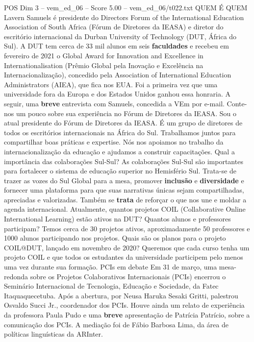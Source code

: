 \begin{textsample}{POS Dim 3 – vem\_ed\_06 – Score 5.00 – vem\_ed\_06/t022.txt}  \label{ex:f3_pos_126}
QUEM É QUEM Lavern Samuels é presidente do Directors Forum of the International Education Association of South Africa (Fórum de Diretores da IEASA) e diretor do escritório internacional da Durban University of Technology (DUT, África do Sul).
A DUT tem cerca de 33 mil alunos em seis \textbf{faculdades} e recebeu em fevereiro de 2021 o Global Award for Innovation and Excellence in Internationalisation (Prêmio Global pela Inovação e Excelência na Internacionalização), concedido pela Association of International Education Administrators (AIEA), que fica nos EUA.
Foi a primeira vez que uma universidade fora da Europa e dos Estados Unidos ganhou essa honraria.
A seguir, uma \textbf{breve} entrevista com Samuels, concedida a VEm por e-mail.
Conte-nos um pouco sobre sua experiência no Fórum de Diretores da IEASA.
Sou o atual presidente do Fórum de Diretores da IEASA.
É um grupo de diretores de todos os escritórios internacionais na África do Sul.
Trabalhamos juntos para compartilhar boas práticas e expertise.
Nós nos apoiamos no trabalho da internacionalização da educação e ajudamos a construir capacitações.
Qual a importância das colaborações Sul-Sul?
As colaborações Sul-Sul são importantes para fortalecer o sistema de educação superior no Hemisfério Sul.
Trata-se de trazer as vozes do Sul Global para a mesa, promover \textbf{inclusão} e \textbf{diversidade} e fornecer uma plataforma para que suas narrativas únicas sejam compartilhadas, apreciadas e valorizadas.
Também se \textbf{trata} de reforçar o que nos une e moldar a agenda internacional.
Atualmente, quantos projetos COIL (Collaborative Online International Learning) estão ativos na DUT?
Quantos alunos e professores participam?
Temos cerca de 30 projetos ativos, aproximadamente 50 professores e 1000 alunos participando nos projetos.
Quais são os planos para o projeto COIL@DUT, lançado em novembro de 2020?
Queremos que cada curso tenha um projeto COIL e que todos os estudantes da universidade participem pelo menos uma vez durante sua formação.
PCIs em debate Em 31 de março, uma mesa-redonda sobre os Projetos Colaborativos Internacionais (PCIs) encerrou o Seminário Internacional de Tecnologia, Educação e Sociedade, da Fatec Itaquaquecetuba.
Após a abertura, por Neusa Haruka Sesaki Gritti, palestrou Osvaldo Succi Jr., coordenador dos PCIs.
Houve ainda um relato de experiência da professora Paula Pudo e uma \textbf{breve} apresentação de Patrícia Patrício, sobre a comunicação dos PCIs.
A mediação foi de Fábio Barbosa Lima, da área de políticas linguísticas da ARInter.

\end{textsample}
